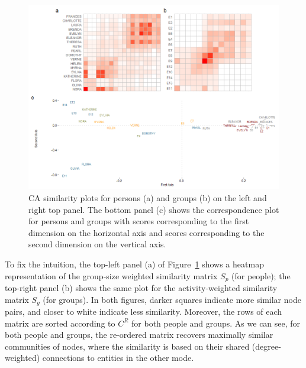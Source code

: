 \documentclass[a4paper,fleqn]{cas-sc}
\begin{document}
\begin{figure}
    \centering
    \includegraphics[width=1.0\textwidth]{Plots/ca-sim.png}
    \caption{CA similarity plots for persons (a) and groups (b) on the left and right top panel. The bottom panel (c) shows the correspondence plot for persons and groups with scores corresponding to the first dimension on the horizontal axis and scores corresponding to the second dimension on the vertical axis.}
    \label{fig:ca-sim}
\end{figure}

To fix the intuition, the top-left panel (a) of Figure~\ref{fig:ca-sim} shows a heatmap representation of the group-size weighted similarity matrix $S_p$ (for people); the top-right panel (b) shows the same plot for the activity-weighted similarity matrix $S_g$ (for groups). In both figures, darker squares indicate more similar node pairs, and closer to white indicate less similarity. Moreover, the rows of each matrix are sorted according to $C^R$ for both people and groups. As we can see, for both people and groups, the re-ordered matrix recovers maximally similar communities of nodes, where the similarity is based on their shared (degree-weighted) connections to entities in the other mode. 
\end{document}
